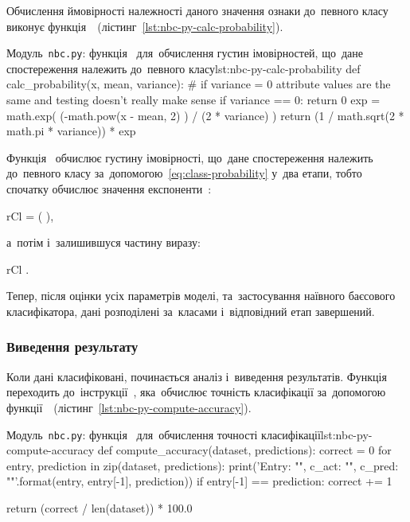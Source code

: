 \documentclass[
	a4paper,
	oneside,
	DIV = 12,
	fontsize = 13pt,
	headings = normal,
	numbers = endperiod,
	bibliography = totoc, %
]{scrartcl}
\theoremstyle{mythm}
\newcommand{\filename}[1]{\texttt{#1}}
\newcommand{\longvar}[1]{\mathit{#1}}
\begin{document}
						Обчислення ймовірності належності даного значення ознаки до~певного класу виконує функція~~(лістинг~\ref{lst:nbc-py-calc-probability}).

						\begin{listingpython}{Модуль~\filename{nbc.py}: функція~ для~обчислення густин імовірностей, що~дане спостереження належить до~певного класу}{lst:nbc-py-calc-probability}
		def calc_probability(x, mean, variance):
				# if variance = 0 attribute values are the same and testing doesn't really make sense
				if variance == 0:
						return 0
				exp = math.exp( (-math.pow(x - mean, 2) ) / (2 * variance) )
				return (1 / math.sqrt(2 * math.pi * variance)) * exp
						\end{listingpython}

						Функція~ обчислює густину імовірності, що~дане спостереження належить до~певного класу за~допомогою~\eqref{eq:class-probability} у~два етапи, тобто спочатку обчислює значення експоненти~:
						\begin{IEEEeqnarray*}{rCl}
							\longvar{exp} = \exp \left( \frac{- \! \left(x - \overline{x} \right)^2}{2 s^2} \right),
						\end{IEEEeqnarray*}
						а~потім і~залишившуся частину виразу:
						\begin{IEEEeqnarray*}{rCl}
							 \cdot \longvar{exp}.
						\end{IEEEeqnarray*}

						Тепер, після оцінки усіх параметрів моделі, та~застосування наївного баєсового класифікатора, дані розподілені за~класами і~відповідний етап завершений.  

						\subsubsection{Виведення результату}
							Коли дані класифіковані, починається аналіз і~виведення результатів. Функція~ переходить до~інструкції~, яка~обчислює точність класифікації за~допомогою функції~~(лістинг~\ref{lst:nbc-py-compute-accuracy}).

						\begin{listingpython}{Модуль~\filename{nbc.py}: функція~ для~обчислення точності класифікації}{lst:nbc-py-compute-accuracy}
		def compute_accuracy(dataset, predictions):
				correct = 0
				for entry, prediction in zip(dataset, predictions):
						print('Entry: "{}", c_act: "{}", c_pred: "{}"'.format(entry, entry[-1], prediction))
						if entry[-1] == prediction:
								correct += 1

				return (correct / len(dataset)) * 100.0
						\end{listingpython}
\end{document}

